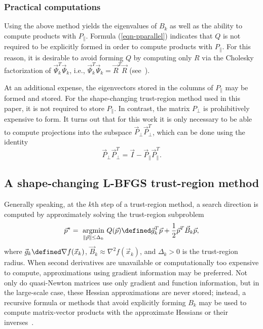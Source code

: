 {\subsubsection{Practical computations}
Using the above method yields the eigenvalues of $B_k$ as well as the
ability to compute products with $P_\parallel$. 
Formula (\ref{eqn-pparallel}) indicates that $Q$ is not
required to be explicitly formed in order to compute products with
$P_\parallel$.
For this reason, it is desirable to avoid
forming $Q$ by computing only $R$ via the Cholesky factorization of
$ \vec{\Psi}^T_k\vec{\Psi}_k$,
i.e., $ \vec{\Psi}^T_k\vec{\Psi}_k = \vec{R}^T\vec{R} $
(see~\cite{BurdakovLMTR16}).

At an additional expense,
the eigenvectors stored in the columns of $P_\parallel$ may be formed and
stored.  For the shape-changing trust-region method used in this paper, it
is not required to store $P_\parallel$.
In contrast, the matrix $P_\perp$ is
prohibitively expensive to form.  It turns out that for this work it is
only necessary to be able to compute projections into the subspace $
\vec{P}_{\perp} \vec{P}_{\perp}^T $, which can be done using the
identity
\begin{equation} \label{eqn-projection}
\vec{P}_{\perp}\vec{P}^T_{\perp} = \vec{I}-
\vec{P}_{\parallel}\vec{P}^T_{\parallel}.
\end{equation}


\subsection{A shape-changing L-BFGS trust-region method}
Generally speaking,
at
 the $k$th step of a trust-region method, a search direction is computed by
approximately solving the trust-region subproblem
\begin{equation}
	\label{eq:subproblem}
		\vec{p}^* = \underset{\left\| \vec{p} \right\| \le {\Delta_k}}{\text{ argmin }} Q(\vec{p}) \defined\vec{g}^T_k \vec{p} + \frac{1}{2} \vec{p}^T \vec{B}_k \vec{p}, 
\end{equation}
where $ \vec{g}_k \defined \nabla f(\vec{x}_k) $, $ \vec{B}_k \approx
\nabla^2 f(\vec{x}_k) $, and $ \Delta_k > 0 $ is the trust-region radius.
When second derivatives are unavailable or computationally too expensive to
compute, approximations using gradient information may be preferred.  Not
only do quasi-Newton matrices use only gradient and function information,
but in the large-scale case, these Hessian approximations are never stored;
instead, a recursive formula or methods that avoid explicitly forming $B_k$
may be used to compute matrix-vector products with the approximate Hessians
or their inverses~\cite{ByrNS94,ErwayM15,ErwayMarcia17LAA,LukV13}.
 
}
